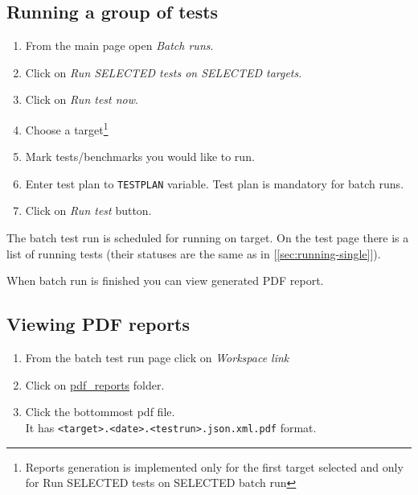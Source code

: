\subsection{Running a group of tests}
\label{sec:running-batch}

\begin{enumerate}
\item From the main page open \textit{Batch runs}.
\item Click on \textit{Run SELECTED tests on SELECTED targets}.
\item Click on \textit{Run test now}.
\item Choose a target\footnote{Reports generation is implemented only for the first target selected and only for Run SELECTED tests on SELECTED batch run}
\item Mark tests/benchmarks you would like to run.
\item Enter test plan to \texttt{TESTPLAN} variable. Test plan is mandatory for batch runs.
\item Click on \textit{Run test} button.
\end{enumerate}

The batch test run is scheduled for running on target. On the test page there is a list of running tests (their statuses are the same as in [\ref{sec:running-single}]).

When batch run is finished you can view generated PDF report.

\subsection{Viewing PDF reports}
\label{sec:view-pdf}
\begin{enumerate}
 \item From the batch test run page click on \textit{Workspace link}
\item Click on
  \href{http://localhost:8080/view/batch\%20runs/job/Run\%20SELECTED\%20tests\%20on\%20SELECTED\%20targets/ws/pdf\_reports/}{pdf\_reports} folder.
\item Click the bottommost pdf file. \\ It has \texttt{<target>.<date>.<testrun>.json.xml.pdf} format.

\end{enumerate}

